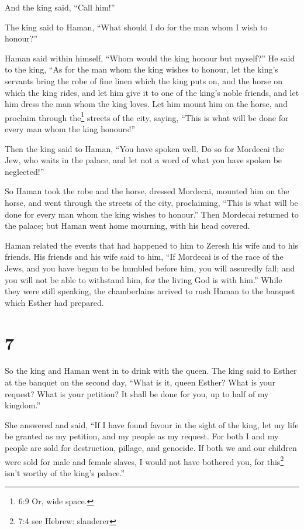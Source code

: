 And the king said, ``Call him!''

 The king said to Haman, ``What should I do for the man whom
I wish to honour?''

Haman said within himself, ``Whom would the king honour but myself?''
 He said to the king, ``As for the man whom the king wishes
to honour,  let the king's servants bring the robe of fine
linen which the king puts on, and the horse on which the king rides,
 and let him give it to one of the king's noble friends, and
let him dress the man whom the king loves. Let him mount him on the
horse, and proclaim through the\footnote{6:9 Or, wide space.} streets of
the city, saying, ``This is what will be done for every man whom the
king honours!''

 Then the king said to Haman, ``You have spoken well. Do so
for Mordecai the Jew, who waits in the palace, and let not a word of
what you have spoken be neglected!''

 So Haman took the robe and the horse, dressed Mordecai,
mounted him on the horse, and went through the streets of the city,
proclaiming, ``This is what will be done for every man whom the king
wishes to honour.''  Then Mordecai returned to the palace;
but Haman went home mourning, with his head covered.

 Haman related the events that had happened to him to
Zeresh his wife and to his friends. His friends and his wife said to
him, ``If Mordecai is of the race of the Jews, and you have begun to be
humbled before him, you will assuredly fall; and you will not be able to
withstand him, for the living God is with him.''  While
they were still speaking, the chamberlains arrived to rush Haman to the
banquet which Esther had prepared.

\hypertarget{section-6}{%
\section{7}\label{section-6}}

 So the king and Haman went in to drink with the queen.
 The king said to Esther at the banquet on the second day,
``What is it, queen Esther? What is your request? What is your petition?
It shall be done for you, up to half of my kingdom.''

 She answered and said, ``If I have found favour in the
sight of the king, let my life be granted as my petition, and my people
as my request.  For both I and my people are sold for
destruction, pillage, and genocide. If both we and our children were
sold for male and female slaves, I would not have bothered you, for
this\footnote{7:4 see Hebrew: slanderer} isn't worthy of the king's
palace.''

